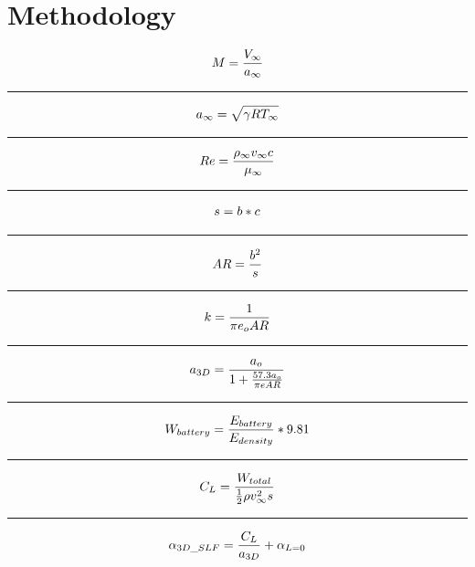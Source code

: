 \documentclass[12pt,A4paper]{article}
\begin{document}
	\section{Methodology}
	\begin{equation} \label{eq1} 
		M = \frac{V_\infty }{a_\infty} \\ 
	\end{equation}
	\hrule
	\vspace{0.1 in}
	\begin{equation}
		a_\infty = \sqrt{\gamma R T_\infty} \\
	\end{equation}
	\hrule
	\vspace{0.1 in}
	\begin{equation}
		Re = \frac{\rho_\infty v_\infty c}{\mu_\infty} \\
	\end{equation}
	\hrule
	\vspace{0.1 in}
	\begin{equation}
		s = b * c \\
	\end{equation}
	\hrule
	\vspace{0.1 in}
	\begin{equation}
		AR = \frac{b^2}{s} \\
	\end{equation}
	\hrule
	\vspace{0.1 in}
	\begin{equation}
		k = \frac{1}{\pi e_o AR} \\
	\end{equation}
	\hrule
	\vspace{0.1 in}
	\begin{equation}
		a_{3D} = \frac{a_o}{1 + \frac{57.3 a_o}{\pi e AR}} \\
	\end{equation}
	\hrule
	\vspace{0.1 in}
	\begin{equation}
		W_{battery} = \frac{E_{battery}}{E_{density}} *9.81 \\
	\end{equation}
	\hrule
	\vspace{0.1 in}
	\begin{equation}
		C_L = \frac{W_{total}}{\frac{1}{2} \rho  v_\infty^2  s} \\
	\end{equation}
	\hrule
	\vspace{0.1 in}
	\begin{equation}
		\alpha_{3D\_SLF} = \frac{C_L}{a_{3D}}+\alpha_{L=0} \\
	\end{equation}
\end{document}
